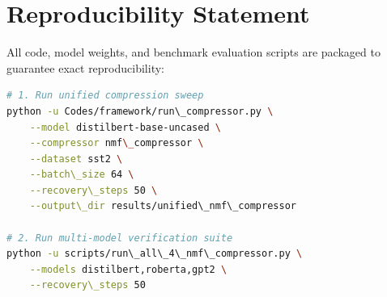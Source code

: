\section{Reproducibility Statement}
All code, model weights, and benchmark evaluation scripts are packaged to guarantee exact reproducibility:
\begin{lstlisting}[language=bash]
# 1. Run unified compression sweep
python -u Codes/framework/run\_compressor.py \
    --model distilbert-base-uncased \
    --compressor nmf\_compressor \
    --dataset sst2 \
    --batch\_size 64 \
    --recovery\_steps 50 \
    --output\_dir results/unified\_nmf\_compressor

# 2. Run multi-model verification suite
python -u scripts/run\_all\_4\_nmf\_compressor.py \
    --models distilbert,roberta,gpt2 \
    --recovery\_steps 50
\end{lstlisting}
